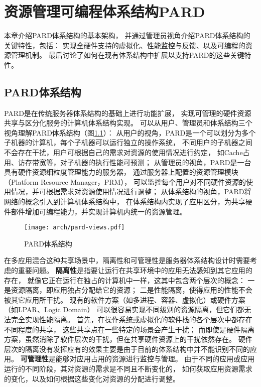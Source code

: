 

\chapter{资源管理可编程体系结构PARD}
\label{chap:pardarch}

本章介绍PARD体系结构的基本架构，
并通过管理员视角介绍PARD体系结构的关键特性，包括：
实现全硬件支持的虚拟化、性能监控与反馈、以及可编程的资源管理机制。
最后讨论了如何在现有体系结构中扩展以支持PARD的这些关键特性。

\section{PARD体系结构}

PARD是在传统服务器体系结构的基础上进行功能扩展，
实现可管理的硬件资源共享与区分化服务的计算机体系结构实现。
可以从用户、管理员和体系结构三个视角理解PARD体系结构（图\ref{fig:pard-views}）：
从用户的视角，PARD是一个可以划分为多个子机器的计算机，每个子机器可以运行独立的操作系统，
不同用户的子机器之间不会存在干扰，用户可根据自己的需求对资源的使用情况进行约定，
如Cache占用、访存带宽等，对子机器的执行性能可预测；
从管理员的视角，PARD是一台具有硬件资源细粒度管理能力的服务器，
通过服务器上配置的资源管理模块（Platform Resource Manager，PRM），
可以监控每个用户对不同硬件资源的使用情况，并可根据需求对资源使用情况进行调整；
从体系结构的视角，PARD将网络的概念引入到计算机体系结构中，
在体系结构内实现了应用区分，为共享硬件部件增加可编程能力，并实现计算机内统一的资源管理。

\begin{figure}[t]
  \centering
  \texttt{[image: arch/pard-views.pdf]}
  \caption{PARD体系结构}
  \label{fig:pard-views}
\end{figure}

在多应用混合这种共享场景中，隔离性和可管理性是服务器体系结构设计时需要考虑的重要问题。
\textbf{隔离性}是指要让运行在共享环境中的应用无法感知到其它应用的存在，
就像它正在运行在独占的计算机中一样，这其中包含两个层次的概念：
一是资源隔离，即应用独占分配给它的资源；
二是性能隔离，使得应用的性能不会被其它应用所干扰。
现有的软件方案（如多进程、容器、虚拟化）或硬件方案（如LPAR、Logic Domain）
可以很容易实现不同级别的资源隔离，但它们都无法完全实现性能隔离。
首先，在操作系统或虚拟化的软件栈的各个层次中都存在不同程度的共享，
这些共享点在一些特定的场景会产生干扰；
而即使是硬件隔离方案，虽然消除了软件层次的干扰，但在共享硬件资源上的干扰依然存在。
硬件层次的隔离没有发挥应有的效果主要是由于目前的体系结构中并不能识别不同的应用。
\textbf{可管理性}是能够对应用占用的资源进行监控与管理。
由于不同的应用或应用运行的不同阶段，其对资源的需求是不同且不断变化的，
如何获取应用资源需求的变化，以及如何根据这些变化对资源的分配进行调整。

